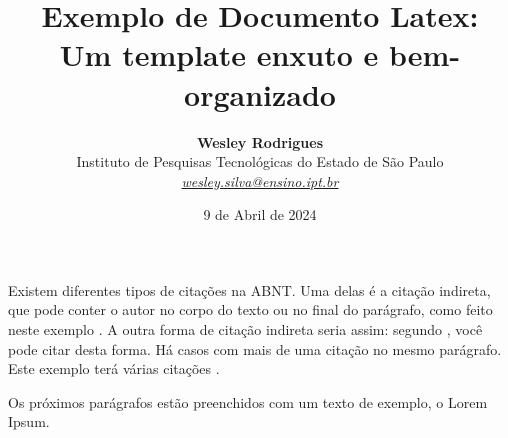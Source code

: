 \documentclass[a4paper,12pt]{article}
\title{
    \textbf{Exemplo de Documento Latex:}\\
    Um template enxuto e bem-organizado
}
\author{
    \textbf{Wesley Rodrigues}\\
    \small{Instituto de Pesquisas Tecnológicas do Estado de São Paulo}\\
    \small{\textit{\url{wesley.silva@ensino.ipt.br}}}
}
\date{9 de Abril de 2024}
\begin{document}
\maketitle
\onehalfspacing

Existem diferentes tipos de citações na ABNT. Uma delas é a citação indireta, que pode conter o autor no corpo do texto ou no final do parágrafo, como feito neste exemplo \cite{TR_1991b}. A outra forma de citação indireta seria assim: segundo \textcite{JART_2017}, você pode citar desta forma. Há casos com mais de uma citação no mesmo parágrafo. Este exemplo terá várias citações \cite{INPRO_2015,DISSERT_2022,ABNT_NBR_12836}.

Os próximos parágrafos estão preenchidos com um texto de exemplo, o Lorem Ipsum. \lipsum[1-10]

\printbibliography[title=Referências]

\end{document}
